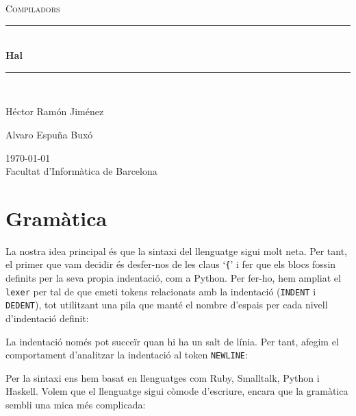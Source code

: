 \documentclass[a4paper,11pt]{article}
\newcommand{\assignatura}{Compiladors}
\newcommand{\titol}{Hal}
\newcommand{\Pautor}{Héctor Ramón Jiménez}
\newcommand{\Sautor}{Alvaro Espuña Buxó}
\newcommand{\HRule}{\rule{\linewidth}{0.5mm}}
\begin{document}
\begin{titlepage}
  \begin{center}
    \textsc{\Large \assignatura}\\[0.5cm]
    \HRule \\[0.4cm]
     { \huge \bfseries \titol \\[0.4cm] }
    \HRule \\[0.8cm]
    \begin{minipage}{0.4\textwidth}
      \begin{flushleft}
        \large \Pautor
      \end{flushleft}
    \end{minipage}
    \begin{minipage}{0.4\textwidth}
      \begin{flushright}
        \large \Sautor
      \end{flushright}
    \end{minipage}

    \vfill
    {\large \today} \\[0.3cm]
    {\large Facultat d'Informàtica de Barcelona}
  \end{center}
\end{titlepage}
\newpage\null\thispagestyle{empty}\newpage

\section{Gramàtica}

La nostra idea principal és que la sintaxi del llenguatge sigui molt neta. Per tant, el primer que vam decidir és desfer-nos de les claus `\texttt{\{}' i fer que els blocs fossin definits per la seva propia indentació, com a Python. Per fer-ho, hem ampliat el \texttt{lexer} per tal de que emeti tokens relacionats amb la indentació (\texttt{INDENT} i \texttt{DEDENT}), tot utilitzant una pila que manté el nombre d'espais per cada nivell d'indentació definit:



\noindent La indentació només pot succeïr quan hi ha un salt de línia. Per tant,
afegim el comportament d'analitzar la indentació al token \texttt{NEWLINE}:



\noindent Per la sintaxi ens hem basat en llenguatges com Ruby, Smalltalk, Python
i Haskell. Volem que el llenguatge sigui còmode d'escriure, encara que
la gramàtica sembli una mica més complicada:
\end{document}
